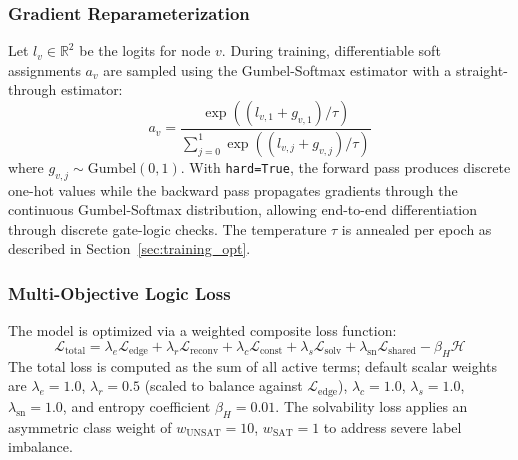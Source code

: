 \documentclass[conference]{IEEEtran}
\begin{document}
\subsubsection{Gradient Reparameterization}
Let $l_v \in \mathbb{R}^2$ be the logits for node $v$. During training, differentiable soft assignments $a_v$ are sampled using the Gumbel-Softmax estimator \cite{jang2016categorical} with a straight-through estimator:
\begin{equation}
   a_{v} = \frac{\exp((l_{v,1} + g_{v,1})/\tau)}{\sum_{j=0}^{1} \exp((l_{v,j} + g_{v,j})/\tau)}
\end{equation}
where $g_{v,j} \sim \text{Gumbel}(0,1)$. With \texttt{hard=True}, the forward pass produces discrete one-hot values while the backward pass propagates gradients through the continuous Gumbel-Softmax distribution, allowing end-to-end differentiation through discrete gate-logic checks. The temperature $\tau$ is annealed per epoch as described in Section~\ref{sec:training_opt}.

\subsubsection{Multi-Objective Logic Loss}
The model is optimized via a weighted composite loss function:
\begin{equation}
   \mathcal{L}_{\text{total}} = \lambda_e \mathcal{L}_{\text{edge}} + \lambda_r \mathcal{L}_{\text{reconv}}
     + \lambda_c \mathcal{L}_{\text{const}} + \lambda_s \mathcal{L}_{\text{solv}}
     + \lambda_{\text{sn}} \mathcal{L}_{\text{shared}} - \beta_H \mathcal{H}
\end{equation}
The total loss is computed as the sum of all active terms; default scalar weights are $\lambda_e = 1.0$, $\lambda_r = 0.5$ (scaled to balance against $\mathcal{L}_{\text{edge}}$), $\lambda_c = 1.0$, $\lambda_s = 1.0$, $\lambda_{\text{sn}} = 1.0$, and entropy coefficient $\beta_H = 0.01$. The solvability loss applies an asymmetric class weight of $w_{\text{UNSAT}} = 10$, $w_{\text{SAT}} = 1$ to address severe label imbalance.
\end{document}
